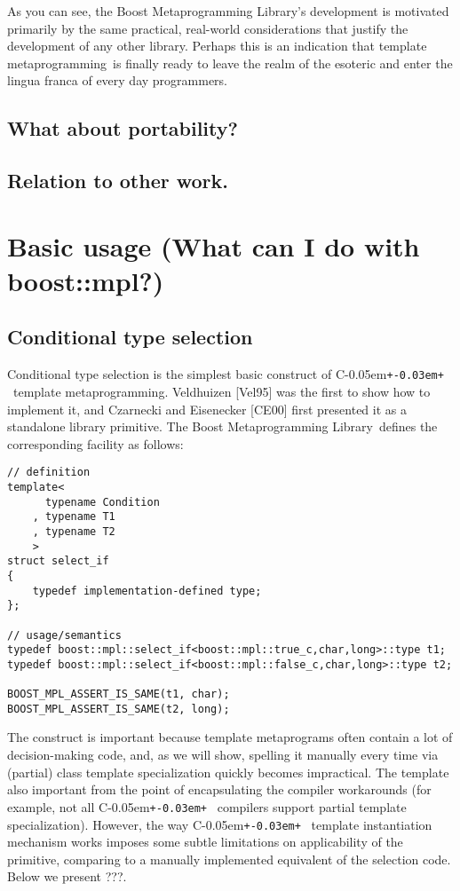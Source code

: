 \documentclass{netobjectdays}
\newcommand{\Cpp}{C\kern-0.05em\texttt{+\kern-0.03em+}%
}
\newcommand{\Mpl}{Boost Meta\-program\-ming Library}
\newcommand{\mping}{meta\-program\-ming}
\newcommand{\mpgms}{meta\-programs}
\begin{document}
As you can see, the \Mpl's development is motivated primarily by the
same practical, real-world considerations that justify the development
of any other library. Perhaps this is an indication that template
\mping\ is finally ready to leave the realm of the esoteric and enter
the lingua franca of every day programmers.

\subsection{What about portability? }

\subsection{Relation to other work.}

\section{Basic usage (What can I do with boost::mpl?)}

\subsection{Conditional type selection}

Conditional type selection is the simplest basic construct of \Cpp\
template \mping{}. Veldhuizen [Vel95] was the first to show 
how to implement it, and Czarnecki and Eisenecker [CE00] first 
presented it as a standalone library primitive. The \Mpl\ defines the 
corresponding facility as follows:


{\footnotesize
\begin{verbatim}
// definition
template<
      typename Condition
    , typename T1
    , typename T2
    >
struct select_if
{
    typedef implementation-defined type;
};

// usage/semantics
typedef boost::mpl::select_if<boost::mpl::true_c,char,long>::type t1;
typedef boost::mpl::select_if<boost::mpl::false_c,char,long>::type t2;

BOOST_MPL_ASSERT_IS_SAME(t1, char);
BOOST_MPL_ASSERT_IS_SAME(t2, long);
\end{verbatim}
}

The construct is important because template \mpgms{} often 
contain a lot of decision-making code, and, as we will show, 
spelling it manually every time via (partial) class template 
specialization quickly becomes impractical. The template also 
important from the point of encapsulating the compiler 
workarounds (for example, not all \Cpp\ compilers support 
partial template specialization). However, the way \Cpp\ 
template instantiation mechanism works imposes some subtle 
limitations on applicability of the primitive, comparing to 
a manually implemented equivalent of the selection code. 
Below we present ???.
\end{document}
